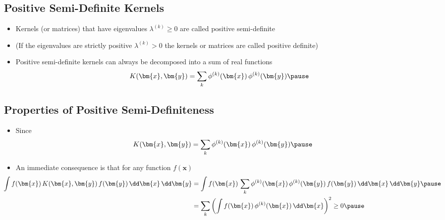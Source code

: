\Outline %

\begin{slide}
\section{Positive Semi-Definite Kernels}

\begin{PauseHighLight}
  \begin{itemize}
  \item Kernels (or matrices) that have eigenvalues $\lambda^{(k)}\geq0$ are
    called positive semi-definite\pause
  \item (If the eigenvalues are strictly positive $\lambda^{(k)}>0$ the
    kernels or matrices are called positive definite)\pause
  \item Positive semi-definite kernels can always be decomposed into a
    sum of real functions
    \begin{align*}
      K(\bm{x}, \bm{y}) &= \sum_k \phi^{(k)}(\bm{x})\,\phi^{(k)}(\bm{y})\pause
    \end{align*}
  \end{itemize}
\end{PauseHighLight}


\end{slide}


\begin{slide}
\section[-1]{Properties of Positive Semi-Definiteness}

\begin{PauseHighLight}
  \begin{itemize}
  \item Since 
    \begin{align*}
      K(\bm{x}, \bm{y}) = \sum_k \phi^{(k)}(\bm{x})\,\phi^{(k)}(\bm{y})\pause
    \end{align*}
  \item An immediate consequence is that for any function $f(\bm{x})$
   \begin{align*}
      \hspace*{-2em}\int f(\bm{x})\, K(\bm{x}, \bm{y})\, f(\bm{y})\,\dd\bm{x}\, \dd
       \bm{y} &= \int f(\bm{x})\, \sum_k
      \phi^{(k)}(\bm{x})\,\phi^{(k)}(\bm{y})\, f(\bm{y})\,\dd\bm{x}\, \dd
      \bm{y}\pause  \\
      &=\sum_k \left( \int f(\bm{x})\, \phi^{(k)}(\bm{x})\,\dd\bm{x}
      \right)^2 \geq 0\pause
    \end{align*}
  \end{itemize}
\end{PauseHighLight}


\end{slide}

